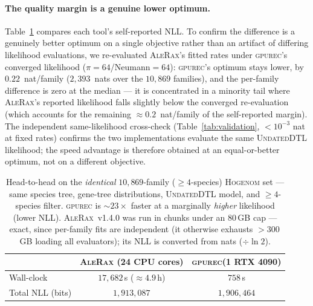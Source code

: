 \documentclass[11pt]{article}
\newcommand{\toolname}{\textsc{gpurec}\xspace}
\begin{document}
\paragraph{The quality margin is a genuine lower optimum.} Table~\ref{tab:speed-headline}
compares each tool's self-reported NLL. To confirm the difference is a genuinely better
optimum on a single objective rather than an artifact of differing likelihood
evaluations, we re-evaluated \textsc{AleRax}'s fitted rates under \toolname's converged
likelihood ($\pi{=}64$/Neumann${=}64$): \toolname's optimum stays lower, by
$0.22$~nat/family ($2{,}393$~nats over the $10{,}869$ families), and the per-family
difference is zero at the median --- it is concentrated in a minority tail where
\textsc{AleRax}'s reported likelihood falls slightly below the converged re-evaluation
(which accounts for the remaining $\approx\!0.2$~nat/family of the self-reported margin).
The independent same-likelihood cross-check (Table~\ref{tab:validation}, $<\!10^{-3}$ nat
at fixed rates) confirms the two implementations evaluate the same \textsc{UndatedDTL}
likelihood; the speed advantage is therefore obtained at an equal-or-better optimum, not
on a different objective.

\begin{table}[h]\centering
\caption{Head-to-head on the \emph{identical} $10{,}869$-family ($\geq\!4$-species)
\textsc{Hogenom} set --- same species tree, gene-tree distributions,
\textsc{UndatedDTL} model, and $\geq\!4$-species filter. \toolname is
$\sim\!23\times$ faster at a marginally \emph{higher} likelihood (lower NLL).
\textsc{AleRax}~v1.4.0 was run in chunks under an $80$\,GB cap --- exact, since
per-family fits are independent (it otherwise exhausts $>\!300$\,GB loading all
evaluators); its NLL is converted from nats ($\div\ln2$).}
\label{tab:speed-headline}
\begin{tabular}{lcc}
\toprule
 & \textsc{AleRax} (24 CPU cores) & \toolname (1 RTX 4090) \\
\midrule
Wall-clock        & $17{,}682$\,s ($\approx\!4.9$\,h) & $758$\,s \\
Total NLL (bits)  & $1{,}913{,}087$                   & $1{,}906{,}464$ \\
\bottomrule
\end{tabular}
\end{table}
\end{document}

